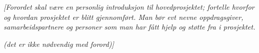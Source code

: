 \documentclass[../main.tex]{subfiles}
\begin{document}


\bigskip

{\itshape\color{blue}
[Forordet skal v{\ae}re en personlig introduksjon til hovedprosjektet; fortelle hvorfor og hvordan prosjektet er blitt
gjennomf{\o}rt. Man b{\o}r evt nevne oppdragsgiver, samarbeidspartnere og personer som man har f{\aa}tt hjelp og
st{\o}tte fra i prosjektet. \ }

{\itshape\color{blue}
(det er ikke n{\o}dvendig med forord)]}
\end{document}
